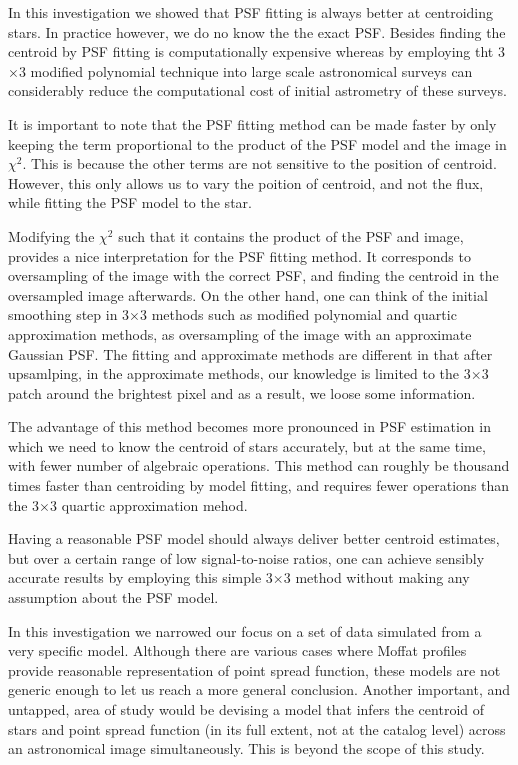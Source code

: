\documentclass[12pt, preprint]{aastex}
\begin{document}
In this investigation we showed that PSF fitting is always better at centroiding stars.
In practice however, we do no know the the exact PSF. Besides finding the centroid by PSF
fitting is computationally expensive whereas by employing tht 3$\times$3 modified polynomial
technique into large scale astronomical surveys can considerably reduce the computational cost
of initial astrometry of these surveys.

It is important to note that the PSF fitting method can be made faster by only keeping the 
term proportional to the product of the PSF model and the image in $\chi^2$. This is because 
the other terms are not sensitive to the position of centroid. However, this only allows
us to vary the poition of centroid, and not the flux, while fitting the PSF model
to the star. 

Modifying the $\chi^2$ such that it contains the product of the PSF and image, 
provides a nice interpretation for the PSF fitting method. It corresponds to oversampling
of the image with the correct PSF, and finding the centroid in the oversampled image afterwards.
On the other hand, one can think of the initial smoothing step in 3$\times$3 methods
such as modified polynomial and quartic approximation methods, as oversampling of the 
image with an approximate Gaussian PSF. The fitting and approximate methods are different 
in that after upsamlping, in the approximate methods, our knowledge is limited to the 3$\times$3 
patch around the brightest pixel and as a result, we loose some information.

The advantage of this method becomes more pronounced
in PSF estimation in which we need to know the centroid of stars accurately, but at the
same time, with fewer number of algebraic operations. This method can roughly be thousand
times faster than centroiding by model fitting, and requires fewer operations than the
3$\times$3 quartic approximation mehod.

Having a reasonable PSF model should always deliver better centroid estimates, but
over a certain range of low signal-to-noise ratios, one can achieve sensibly accurate
results by employing this simple 3$\times$3 method without making any assumption about
the PSF model.

In this investigation we narrowed our focus on a set of data simulated from a very specific
model. Although there are various cases where Moffat profiles provide reasonable
representation of point spread function, these models are not generic enough to let us
reach a more general conclusion. Another important, and untapped, area of study
would be devising a model that infers the centroid of stars and point spread function
(in its full extent, not at the catalog level) across an astronomical image simultaneously.
This is beyond the scope of this study. 
\end{document}
